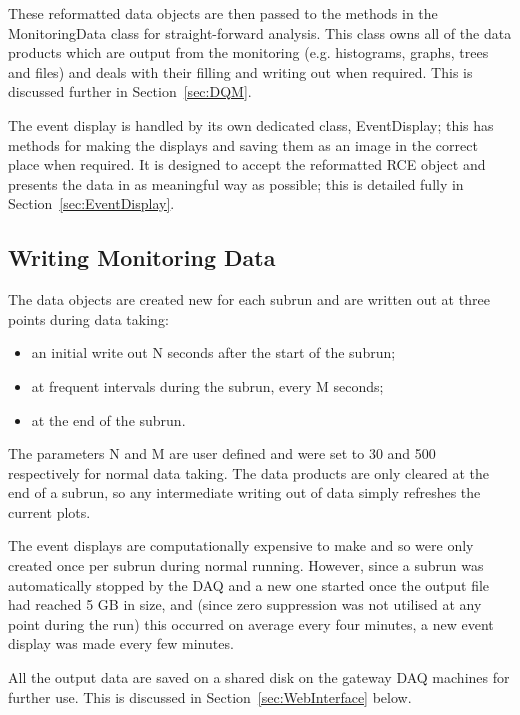 These reformatted data objects are then passed to the methods in the MonitoringData class for straight-forward analysis.  This class owns all of the data products which are output from the monitoring (e.g. histograms, graphs, trees and files) and deals with their filling and writing out when required.  This is discussed further in Section~\ref{sec:DQM}.

The event display is handled by its own dedicated class, EventDisplay; this has methods for making the displays and saving them as an image in the correct place when required.  It is designed to accept the reformatted RCE object and presents the data in as meaningful way as possible; this is detailed fully in Section~\ref{sec:EventDisplay}.

\subsection{Writing Monitoring Data}\label{sec:WritingMonitoringData}

The data objects are created new for each subrun and are written out at three points during data taking:
\begin{itemize}
\item an initial write out N seconds after the start of the subrun;
\item at frequent intervals during the subrun, every M seconds;
\item at the end of the subrun.
\end{itemize}
The parameters N and M are user defined and were set to 30 and 500 respectively for normal data taking.  The data products are only cleared at the end of a subrun, so any intermediate writing out of data simply refreshes the current plots.

The event displays are computationally expensive to make and so were only created once per subrun during normal running.  However, since a subrun was automatically stopped by the DAQ and a new one started once the output file had reached 5 GB in size, and (since zero suppression was not utilised at any point during the run) this occurred on average every four minutes, a new event display was made every few minutes.

All the output data are saved on a shared disk on the gateway DAQ machines for further use.  This is discussed in Section~\ref{sec:WebInterface} below.


